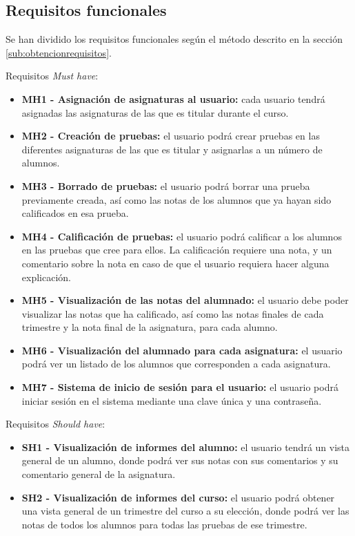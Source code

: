 \subsection{Requisitos funcionales}
Se han dividido los requisitos funcionales según el método descrito en la sección \ref{sub:obtencionrequisitos}.

Requisitos \textit{Must have}:
\begin{itemize}
	\item \textbf{MH1 - Asignación de asignaturas al usuario:} cada usuario tendrá asignadas las asignaturas de las que es titular durante el curso. 
	\item \textbf{MH2 - Creación de pruebas:} el usuario podrá crear pruebas en las diferentes asignaturas de las que es titular y asignarlas a un número de alumnos.
	\item \textbf{MH3 - Borrado de pruebas:} el usuario podrá borrar una prueba previamente creada, así como las notas de los alumnos que ya hayan sido calificados en esa prueba.
	\item \textbf{MH4 - Calificación de pruebas:} el usuario podrá calificar a los alumnos en las pruebas que cree para ellos. La calificación requiere una nota, y un comentario sobre la nota en caso de que el usuario requiera hacer alguna explicación.
	\item \textbf{MH5 - Visualización de las notas del alumnado:} el usuario debe poder visualizar las notas que ha calificado, así como las notas finales de cada trimestre y la nota final de la asignatura, para cada alumno.
	\item \textbf{MH6 - Visualización del alumnado para cada asignatura:} el usuario podrá ver un listado de los alumnos que corresponden a cada asignatura.
	\item \textbf{MH7 - Sistema de inicio de sesión para el usuario:} el usuario podrá iniciar sesión en el sistema mediante una clave única y una contraseña.
\end{itemize}
	
Requisitos \textit{Should have}:
\begin{itemize}
	\item \textbf{SH1 - Visualización de informes del alumno:} el usuario tendrá un vista general de un alumno, donde podrá ver sus notas con sus comentarios y su comentario general de la asignatura.
	\item \textbf{SH2 - Visualización de informes del curso:} el usuario podrá obtener una vista general de un trimestre del curso a su elección, donde podrá ver las notas de todos los alumnos para todas las pruebas de ese trimestre.
\end{itemize}

